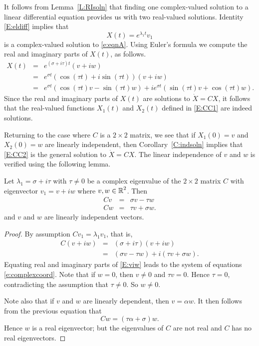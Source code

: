 \documentclass{ximera}
\begin{document}
It follows from Lemma~\ref{L:RIsoln} that finding one complex-valued solution
to a linear differential equation provides us with two real-valued solutions.
Identity \eqref{E:eldiff} implies that
\[
X(t) = e^{\lambda_1 t}v_1
\]
is a complex-valued solution to \eqref{e:eqnA}.  Using Euler's formula we
compute the real and imaginary parts of $X(t)$, as follows.
\begin{eqnarray*}
X(t) & = & e^{(\sigma+i\tau)t}(v+iw) \\
& = & e^{\sigma t} (\cos(\tau t)+i\sin(\tau t))(v+iw)\\
& = & e^{\sigma t}(\cos(\tau t)v-\sin(\tau t)w)+
ie^{\sigma t}(\sin(\tau t)v+\cos(\tau t)w).
\end{eqnarray*}
Since the real and imaginary parts of $X(t)$ are solutions to $\dot{X}=CX$, it
follows that the real-valued functions $X_1(t)$ and $X_2(t)$ defined in
\eqref{E:CC1} are indeed solutions.

Returning to the case where $C$ is a $2\times 2$ matrix, we see that if
$X_1(0)=v$ and $X_2(0)=w$ are linearly independent, then
Corollary~\ref{C:indsoln} implies that \eqref{E:CC2} is the general solution to
$\dot{X}=CX$.  The linear independence of $v$ and $w$ is verified using the
following lemma.

\begin{lemma}  \label{L:rievind}
Let $\lambda_1=\sigma+i\tau$ with $\tau\neq 0$ be a
complex eigenvalue of the
$2\times 2$ matrix $C$ with eigenvector
$v_1=v+iw$ where $v,w\in\mbox{$\Bbb{R}$}^2$.  Then
\begin{equation}  \label{e:complexcoord}
\begin{array}{rcl}
Cv & = & \sigma v - \tau w \\
Cw & = & \tau v + \sigma w.
\end{array}
\end{equation}
and $v$ and $w$ are linearly independent vectors.
\end{lemma}

\begin{proof}   By assumption $Cv_1=\lambda_1v_1$, that is,
\begin{equation}  \label{E:viw}
\begin{array}{rcl}
C (v+iw) & = & (\sigma+i\tau)(v+iw) \\
& = & (\sigma v - \tau w) + i(\tau v + \sigma w).
\end{array}
\end{equation}
Equating real and imaginary parts of \eqref{E:viw} leads to the system of
equations \eqref{e:complexcoord}.  Note that if $w=0$, then $v\neq 0$ and
$\tau v = 0$.  Hence $\tau=0$, contradicting the assumption that
$\tau\neq 0$.  So $w\neq 0$.

Note also that if $v$ and $w$ are linearly dependent, then $v=\alpha w$.
It then follows from the previous equation that
\[
Cw = (\tau\alpha+\sigma)w.
\]
Hence $w$ is a real eigenvector; but the eigenvalues of $C$ are not real and
$C$ has no real eigenvectors.   \end{proof}
\end{document}
